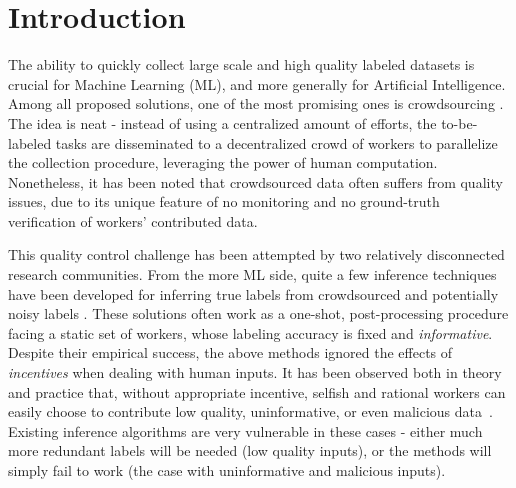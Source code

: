 \section{Introduction}
The ability to quickly collect large scale and high quality labeled datasets is crucial for Machine Learning (ML), and more generally for Artificial Intelligence. Among all proposed solutions, one of the most promising ones is crowdsourcing \cite{slivkins2014online,difallah2015dynamics,simpson2015language}. The idea is neat - instead of using a centralized amount of efforts, the to-be-labeled tasks are disseminated to a decentralized crowd of workers to parallelize the collection procedure, leveraging the power of human computation. Nonetheless, it has been noted that crowdsourced data often suffers from quality issues, due to its unique feature of no monitoring and no ground-truth verification of workers' contributed data. %

This quality control challenge has been attempted by two relatively disconnected research communities. From the more ML side, quite a few inference techniques have been developed for inferring true labels from crowdsourced and potentially noisy labels \citep{raykar2010learning,liu2012variational,zhou2014aggregating,zheng2017truth}. These solutions often work as a one-shot, post-processing procedure facing a static set of workers, whose labeling accuracy is fixed and \emph{informative}. Despite their empirical success, the above methods ignored the effects of \emph{incentives} when dealing with human inputs. It has been observed both in theory and practice that, without appropriate incentive, selfish and rational workers can easily choose to contribute low quality, uninformative, or even malicious data~\citep{sheng2008get,liu2017sequential}. Existing inference algorithms are very vulnerable in these cases - either much more redundant labels will be needed (low quality inputs), or the methods will simply fail to work (the case with uninformative and malicious inputs). 

